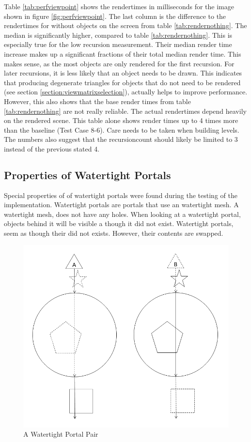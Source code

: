 Table \ref{tab:perfviewpoint} shows the rendertimes in milliseconds for the image shown in figure \ref{fig:perfviewpoint}. The last column is the difference to the rendertimes for without objects on the screen from table \ref{tab:rendernothing}. The median is significantly higher, compared to table \ref{tab:rendernothing}. This is especially true for the low recursion measurement. Their median render time increase makes up a significant fractions of their total median render time. This makes sense, as the most objects are only rendered for the first recursion. For later recursions, it is less likely that an object needs to be drawn. This indicates that producing degenerate triangles for objects that do not need to be rendered (see section \ref{section:viewmatrixselection}), actually helps to improve performance. However, this also shows that the base render times from table \ref{tab:rendernothing} are not really reliable. The actual rendertimes depend heavily on the rendered scene. This table alone shows render times up to 4 times more than the baseline (Test Case 8-6). Care needs to be taken when building levels. The numbers also suggest that the \gls{recursioncount} should likely be limited to 3 instead of the previous stated 4.


\subsection{Properties of Watertight Portals}
\label{section:watertight}
Special properties of of watertight portals were found during the testing of the implementation. Watertight portals are portals that use an watertight mesh. A watertight mesh, does not have any holes. When looking at a watertight portal, objects behind it will be visible a though it did not exist. Watertight portals, seem as though their did not exists. However, their contents are swapped.

\begin{figure}[h]
	\centering
	\includegraphics[width=0.8\linewidth]{images/watertight.png}
	\caption{A Watertight Portal Pair}
	\label{fig:watertightportals}
\end{figure}

